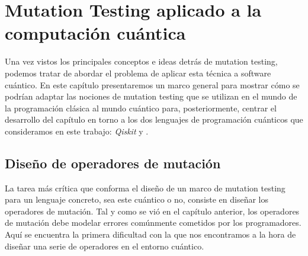 \chapter[Mutation Testing en computación cuántica]{Mutation Testing aplicado a la computación cuántica}
Una vez vistos  los principales conceptos e ideas detrás de  mutation testing, podemos tratar de abordar el problema de aplicar esta técnica a software cuántico. En este capítulo presentaremos un marco  general para mostrar  cómo se podrían adaptar las nociones de mutation testing que se utilizan en el mundo de la programación clásica al mundo cuántico para, posteriormente, centrar el desarrollo del capítulo en torno a los dos lenguajes de programación cuánticos que consideramos en  este trabajo: \textit{Qiskit} y \qsh.

\section{Diseño de operadores de mutación}

La  tarea más crítica que conforma el diseño de un marco de mutation testing para un lenguaje concreto, sea este cuántico o no, consiste en  diseñar  los operadores de mutación. Tal y como se vió en el capítulo anterior, los operadores de mutación debe modelar errores comúnmente cometidos por los programadores. Aquí se encuentra la primera dificultad con la que nos encontramos a la hora de diseñar una serie de operadores en el entorno cuántico.

